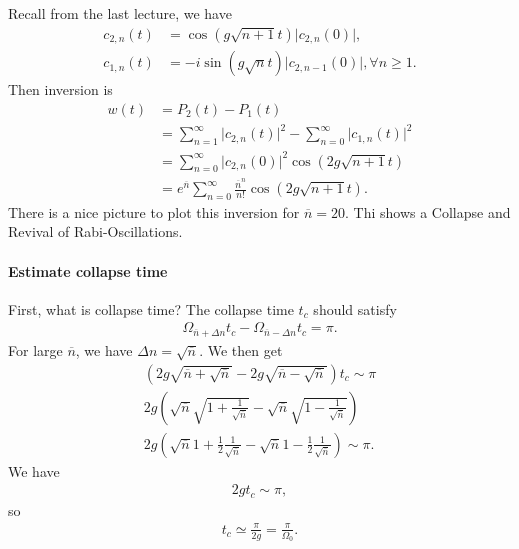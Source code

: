 \documentclass[../../note.tex]{subfiles}
\begin{document}
Recall from the last lecture, we have
\begin{align}
    c_{2,n}(t)
    &= \cos(g \sqrt{n+1} t) \vert c_{2, n}(0) \vert, \\
    c_{1, n}(t)
    &= -i \sin(g \sqrt{n} t) \vert c_{2, n-1}(0) \vert, \forall n \geq 1.
\end{align}
Then inversion is
\begin{align}
    w(t)
    &= P_2(t) - P_1(t) \\
    &= \sum_{n=1}^{\infty} \vert c_{2, n}(t) \vert^2 - \sum_{n=0}^{\infty} \vert c_{1, n}(t) \vert^2 \\
    &= \sum_{n=0}^{\infty} \vert c_{2, n}(0) \vert^2\cos(2 g\sqrt{n+1} t) \\
    &= e^{\overline{n}} \sum_{n=0}^{\infty} \frac{\overline{n}^n}{n!} \cos(2 g \sqrt{n+1} t).
\end{align}
There is a nice picture to plot this inversion for $\overline{n}=20$. Thi shows a Collapse and Revival of Rabi-Oscillations.

\paragraph*{Estimate collapse time}
First, what is collapse time? The collapse time $t_c$ should satisfy
\begin{align}
    \Omega_{\overline{n} + \Delta n} t_c -  \Omega_{\overline{n} - \Delta n} t_c = \pi.
\end{align}
For large $\overline{n}$, we have $\Delta n = \sqrt{\overline{n}}$. We then get
\begin{align}
    (2 g \sqrt{\overline{n} + \sqrt{\overline{n}}} - 2 g \sqrt{\overline{n} - \sqrt{\overline{n}}}) t_c \sim \pi \\
    2 g \left(\sqrt{\overline{n}} \sqrt{1 + \frac{1}{\sqrt{\overline{n}}}} - \sqrt{\overline{n}} \sqrt{1 - \frac{1}{\sqrt{\overline{n}}}} \right) \\
    2 g \left(\sqrt{\overline{n}} {1 + \frac{1}{2}\frac{1}{\sqrt{\overline{n}}}} - \sqrt{\overline{n}} {1 - \frac{1}{2}\frac{1}{\sqrt{\overline{n}}}} \right) \sim \pi.
\end{align}
We have
\begin{align}
    2 g t_c \sim \pi,
\end{align}
so
\begin{align}
    t_c \simeq \frac{\pi}{2 g} = \frac{\pi}{\Omega_0}.
\end{align}
\end{document}
